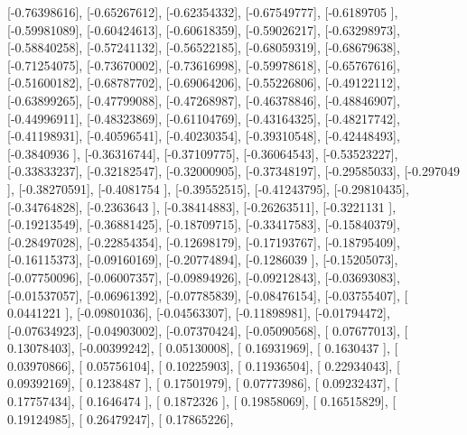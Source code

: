 \documentclass{article}
\begin{document}
       [-0.76398616],
       [-0.65267612],
       [-0.62354332],
       [-0.67549777],
       [-0.6189705 ],
       [-0.59981089],
       [-0.60424613],
       [-0.60618359],
       [-0.59026217],
       [-0.63298973],
       [-0.58840258],
       [-0.57241132],
       [-0.56522185],
       [-0.68059319],
       [-0.68679638],
       [-0.71254075],
       [-0.73670002],
       [-0.73616998],
       [-0.59978618],
       [-0.65767616],
       [-0.51600182],
       [-0.68787702],
       [-0.69064206],
       [-0.55226806],
       [-0.49122112],
       [-0.63899265],
       [-0.47799088],
       [-0.47268987],
       [-0.46378846],
       [-0.48846907],
       [-0.44996911],
       [-0.48323869],
       [-0.61104769],
       [-0.43164325],
       [-0.48217742],
       [-0.41198931],
       [-0.40596541],
       [-0.40230354],
       [-0.39310548],
       [-0.42448493],
       [-0.3840936 ],
       [-0.36316744],
       [-0.37109775],
       [-0.36064543],
       [-0.53523227],
       [-0.33833237],
       [-0.32182547],
       [-0.32000905],
       [-0.37348197],
       [-0.29585033],
       [-0.297049  ],
       [-0.38270591],
       [-0.4081754 ],
       [-0.39552515],
       [-0.41243795],
       [-0.29810435],
       [-0.34764828],
       [-0.2363643 ],
       [-0.38414883],
       [-0.26263511],
       [-0.3221131 ],
       [-0.19213549],
       [-0.36881425],
       [-0.18709715],
       [-0.33417583],
       [-0.15840379],
       [-0.28497028],
       [-0.22854354],
       [-0.12698179],
       [-0.17193767],
       [-0.18795409],
       [-0.16115373],
       [-0.09160169],
       [-0.20774894],
       [-0.1286039 ],
       [-0.15205073],
       [-0.07750096],
       [-0.06007357],
       [-0.09894926],
       [-0.09212843],
       [-0.03693083],
       [-0.01537057],
       [-0.06961392],
       [-0.07785839],
       [-0.08476154],
       [-0.03755407],
       [ 0.0441221 ],
       [-0.09801036],
       [-0.04563307],
       [-0.11898981],
       [-0.01794472],
       [-0.07634923],
       [-0.04903002],
       [-0.07370424],
       [-0.05090568],
       [ 0.07677013],
       [ 0.13078403],
       [-0.00399242],
       [ 0.05130008],
       [ 0.16931969],
       [ 0.1630437 ],
       [ 0.03970866],
       [ 0.05756104],
       [ 0.10225903],
       [ 0.11936504],
       [ 0.22934043],
       [ 0.09392169],
       [ 0.1238487 ],
       [ 0.17501979],
       [ 0.07773986],
       [ 0.09232437],
       [ 0.17757434],
       [ 0.1646474 ],
       [ 0.1872326 ],
       [ 0.19858069],
       [ 0.16515829],
       [ 0.19124985],
       [ 0.26479247],
       [ 0.17865226],
\end{document}
